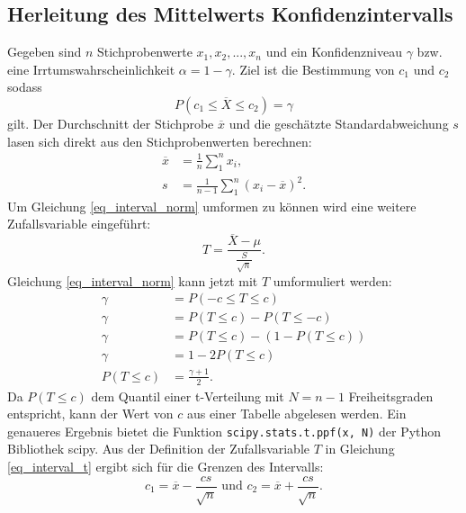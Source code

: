 \documentclass[10pt,twocolumn]{scrartcl}
\begin{document}
	\subsection{Herleitung des Mittelwerts Konfidenzintervalls}
		\label{chap_interval_mean_math}
		Gegeben sind $n$ Stichprobenwerte $x_1, x_2, ..., x_n$ und ein Konfidenzniveau $\gamma$ bzw. eine Irrtumswahrscheinlichkeit $\alpha = 1 - \gamma$.
		Ziel ist die Bestimmung von $c_1$ und $c_2$ sodass
		\begin{equation} \label{eq_interval_norm}
		P(c_1 \le \overline{X} \le c_2) = \gamma
		\end{equation}
		gilt.
		Der Durchschnitt der Stichprobe $\overline{x}$ und die geschätzte Standardabweichung $s$ lasen sich direkt aus den Stichprobenwerten berechnen:
		\begin{align}
		\overline{x} &=  \frac{1}{n} \sum_1^n{x_i} , \\
		s &= \frac{1}{n-1} \sum_1^n{(x_i - \overline{x})^2} .
		\end{align}
		Um Gleichung \ref{eq_interval_norm} umformen zu können wird eine weitere Zufallsvariable eingeführt:
		\begin{equation} \label{eq_interval_t}
		T = \frac{\overline{X} - \mu}{\frac{S}{\sqrt{n}}} .
		\end{equation}
		Gleichung \ref{eq_interval_norm} kann jetzt mit $T$ umformuliert werden:
		\begin{align}
		\gamma &= P(-c \le T \le c) \\ \nonumber
		\gamma &= P(T \le c) - P(T \le -c) \\ \nonumber
		\gamma &= P(T \le c) - (1 - P(T \le c)) \\ \nonumber
		\gamma &= 1 - 2 P(T \le c) \\
		P(T \le c) &= \frac{\gamma + 1}{2} .
		\end{align}
		Da $P(T \le c)$ dem Quantil einer t-Verteilung mit $N = n-1$ Freiheitsgraden entspricht, kann der Wert von $c$ aus einer Tabelle abgelesen werden. Ein genaueres Ergebnis bietet die Funktion \texttt{scipy.stats.t.ppf(x, N)} der Python Bibliothek scipy\cite{scipy}.
		Aus der Definition der Zufallsvariable $T$ in Gleichung \ref{eq_interval_t} ergibt sich für die Grenzen des Intervalls:
		\begin{equation}
		c_1 = \overline{x} - \frac{cs}{\sqrt{n}} \mbox{ und } c_2 = \overline{x} + \frac{cs}{\sqrt{n}}.
		\end{equation}
\end{document}
